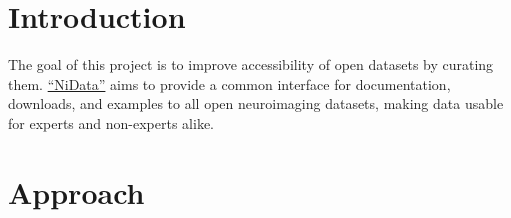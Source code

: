 \documentclass[twocolumn]{bmcart}%
\begin{document}
\begin{frontmatter}
\begin{fmbox}










%
\end{fmbox}%

\end{frontmatter}


\section{Introduction}\label{introduction}

The goal of this project is to improve accessibility of open datasets by
curating them. \href{http://github.com/nidata/nidata}{``NiData''} aims
to provide a common interface for documentation, downloads, and examples
to all open neuroimaging datasets, making data usable for experts and
non-experts alike.

\section{Approach}\label{approach}
\end{document}
